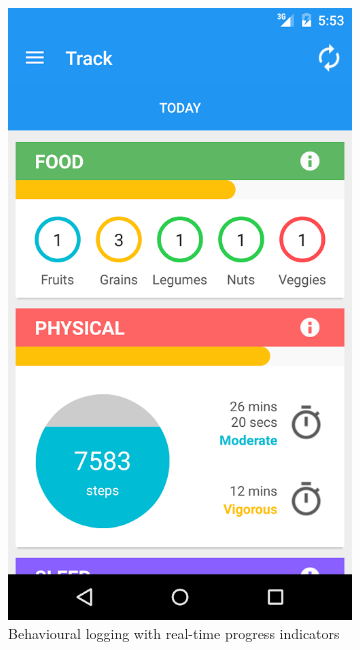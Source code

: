 \begin{figure}[h]
\begin{subfigure}[t]{0.3\textwidth}
        \includegraphics[width=\textwidth]{Files/prevention-study-3/figures/gm-new-log}
        \caption{Behavioural logging with real-time progress indicators}
        \label{fig: gm-new-log}
    \end{subfigure}
    \hfill
    \begin{subfigure}[t]{0.3\textwidth}
        \centering

\end{subfigure}
\end{figure}

